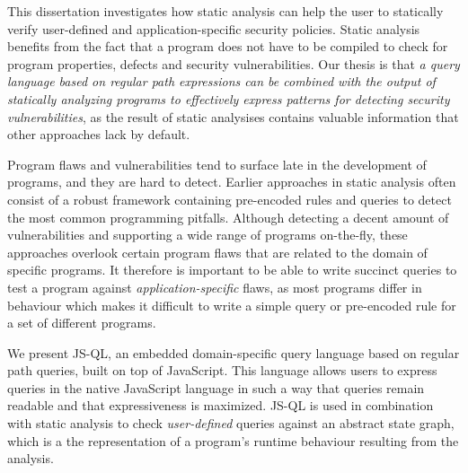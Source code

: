 \setcounter{page}{1}





This dissertation investigates how static analysis can help the user to statically verify user-defined and application-specific security policies. Static analysis benefits from the fact that a program does not have to be compiled to check for program properties, defects and security vulnerabilities. Our thesis is that \textit{a query language based on regular path expressions can be combined with the output of statically analyzing programs to effectively express patterns for detecting security vulnerabilities}, as the result of static analysises contains valuable information that other approaches lack by default. 

Program flaws and vulnerabilities tend to surface late in the development of programs, and they are hard to detect. Earlier approaches in static analysis often consist of a robust framework containing pre-encoded rules and queries to detect the most common programming pitfalls. Although detecting a decent amount of vulnerabilities and supporting a wide range of programs on-the-fly, these approaches overlook certain program flaws that are related to the domain of specific programs. It therefore is important to be able to write succinct queries to test a program against \textit{application-specific} flaws, as most programs differ in behaviour which makes it difficult to write a simple query or pre-encoded rule for a set of different programs. 

We present JS-QL, an embedded domain-specific query language based on regular path queries, built on top of JavaScript. This language allows users to express queries in the native JavaScript language in such a way that queries remain readable and that expressiveness is maximized. JS-QL is used in combination with static analysis to check \textit{user-defined} queries against an abstract state graph, which is a the representation of a program's runtime behaviour resulting from the analysis.



